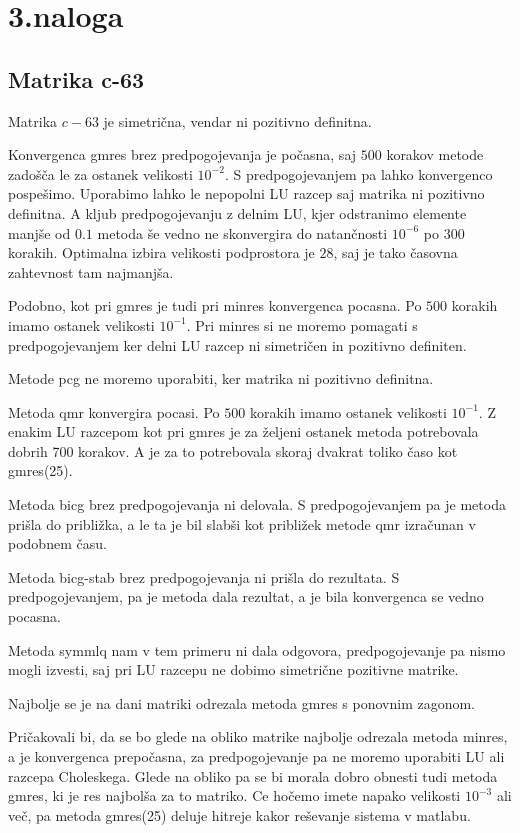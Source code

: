 \documentclass[11pt]{article} %
\begin{document}
\section{3.naloga}

\subsection{Matrika c-63}

Matrika $c-63$ je simetrična, vendar ni pozitivno definitna.

 Konvergenca gmres brez predpogojevanja je počasna, saj $500$ korakov metode zadošča le za ostanek velikosti $10^{-2}$. S predpogojevanjem pa lahko konvergenco pospešimo. Uporabimo lahko le nepopolni LU razcep saj matrika ni pozitivno definitna. A kljub predpogojevanju z delnim LU, kjer odstranimo elemente manjše od $0.1$ metoda še vedno ne skonvergira do natančnosti $10^{-6}$ po $300$ korakih. Optimalna izbira velikosti podprostora je $28$, saj je tako časovna zahtevnost tam najmanjša.

 Podobno, kot pri gmres je tudi pri minres konvergenca pocasna. Po $500$ korakih imamo ostanek velikosti $10^{-1}$. Pri minres si ne moremo pomagati s predpogojevanjem ker delni LU razcep ni  simetričen in pozitivno definiten.
 
 Metode pcg ne moremo uporabiti, ker matrika ni pozitivno definitna.
 
 Metoda qmr konvergira pocasi.  Po $500$ korakih imamo ostanek velikosti $10^{-1}$. Z enakim LU razcepom kot pri gmres je za željeni ostanek metoda potrebovala dobrih 700 korakov. A je za to potrebovala skoraj dvakrat toliko časo kot gmres(25).
 
 Metoda bicg brez predpogojevanja ni delovala. S predpogojevanjem pa je metoda prišla do približka, a le ta je bil slabši kot približek metode qmr izračunan v podobnem času.
 
Metoda bicg-stab brez predpogojevanja ni prišla do rezultata. S predpogojevanjem, pa je metoda dala rezultat, a je bila konvergenca se vedno pocasna.

Metoda symmlq nam v tem primeru ni dala odgovora, predpogojevanje pa nismo mogli izvesti, saj pri LU razcepu ne dobimo simetrične pozitivne matrike.

Najbolje se je na dani matriki odrezala metoda gmres s ponovnim zagonom.

Pričakovali bi, da se bo glede na obliko matrike najbolje odrezala metoda minres, a je konvergenca prepočasna, za predpogojevanje pa ne moremo uporabiti LU ali razcepa Choleskega. Glede na obliko pa se bi morala dobro obnesti tudi metoda gmres, ki je res najbolša za to matriko. Ce hočemo imete napako velikosti $10^{-3}$ ali več, pa metoda gmres(25) deluje hitreje kakor reševanje sistema v matlabu.
\end{document}
